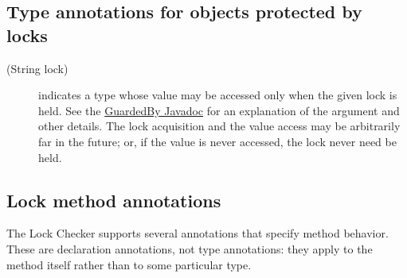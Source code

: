 \subsection{Type annotations for objects protected by locks\label{lock-annotations-objects}}

\begin{description}
\item[\small{(String lock)}]
  indicates a type whose value may be accessed only when the given lock is
  held.
  See the \href{api/org/checkerframework/checker/lock/qual/GuardedBy.html}{GuardedBy
    Javadoc} for an explanation of the argument and other details.  The lock
  acquisition and the value access may be arbitrarily far in the future;
  or, if the value is never accessed, the lock never need be held.
\end{description}

\subsection{Lock method annotations\label{lock-annotations-methods}}

The Lock Checker supports several annotations that specify method behavior.
These are declaration annotations, not type annotations: they apply to the
method itself rather than to some particular type.

